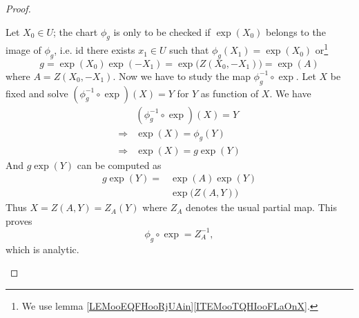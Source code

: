 \begin{proof}
\begin{subproof}
		Let \( X_0\in U\); the chart \( \phi_g\) is only to be checked if \( \exp(X_0)\) belongs to the image of \( \phi_g\), i.e. id there exists \( x_1\in U\) such that \( \phi_g(X_1)=\exp(X_0)\) or\footnote{We use lemma \ref{LEMooEQFHooRjUAin}\ref{ITEMooTQHIooFLaOnX}.}
		\begin{equation}
			g=\exp(X_0)\exp(-X_1)=\exp\big( Z(X_0,-X_1) \big)=\exp(A)
		\end{equation}
		where \( A=Z(X_0,-X_1)\). Now we have to study the map \( \phi_g^{-1}\circ\exp\). Let \( X\) be fixed and solve \( (\phi_g^{-1}\circ \exp)(X)=Y\) for \( Y\) as function of \( X\). We have
		\begin{subequations}
			\begin{align}
				\quad       & (\phi_g^{-1}\circ \exp)(X)=Y \\
				\Rightarrow & \exp(X)=\phi_g(Y)            \\
				\Rightarrow & \exp(X)=g\exp(Y)
			\end{align}
		\end{subequations}
		And \( g\exp(Y)\) can be computed as
		\begin{subequations}
			\begin{align}
				g\exp(Y)= & \exp(A)\exp(Y)         \\
				          & \exp\big( Z(A,Y) \big)
			\end{align}
		\end{subequations}
		Thus \( X=Z(A,Y)=Z_A(Y)\) where \( Z_A\) denotes the usual partial map. This proves
		\begin{equation}
			\phi_g\circ \exp=Z_A^{-1},
		\end{equation}
		which is analytic.

		\spitem[Inverse]


\end{subproof}
\end{proof}
